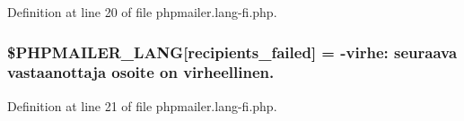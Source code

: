 Definition at line 20 of file phpmailer.\+lang-\/fi.\+php.

\subsubsection[{\texorpdfstring{\$\+P\+H\+P\+M\+A\+I\+L\+E\+R\+\_\+\+L\+A\+NG}{$PHPMAILER_LANG}}]{\setlength{\rightskip}{0pt plus 5cm}\$P\+H\+P\+M\+A\+I\+L\+E\+R\+\_\+\+L\+A\+NG\mbox{[}\textquotesingle{}recipients\+\_\+failed\textquotesingle{}\mbox{]} = -\/virhe\+: seuraava vastaanottaja osoite {\bf on} virheellinen.\textquotesingle{}}\hypertarget{phpmailer_8lang-fi_8php_a7589d30bb9b368327c2df015f3e6bcba}{}\label{phpmailer_8lang-fi_8php_a7589d30bb9b368327c2df015f3e6bcba}


Definition at line 21 of file phpmailer.\+lang-\/fi.\+php.

